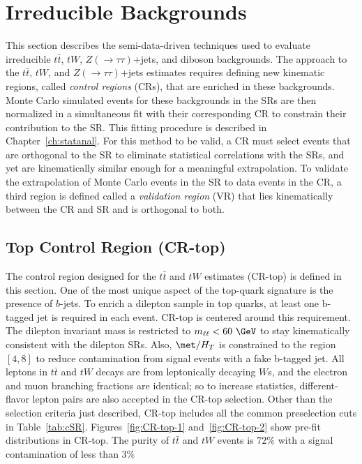 \section{Irreducible Backgrounds}
\label{sec:bkg:irreduce}
This section describes the semi-data-driven techniques used to evaluate irreducible $t\bar{t}$, $tW$, $Z(\rightarrow\tau\tau)$+jets, and diboson backgrounds.  The approach to the $t\bar{t}$, $tW$, and $Z(\rightarrow\tau\tau)$+jets estimates requires defining new kinematic regions, called \textit{control regions} (CRs), that are enriched in these backgrounds.  Monte Carlo simulated events for these backgrounds in the SRs are then normalized in a simultaneous fit with their corresponding CR to constrain their contribution to the SR.  This fitting procedure is described in Chapter~\ref{ch:statanal}.  For this method to be valid, a CR must select events that are orthogonal to the SR to eliminate statistical correlations with the SRs, and yet are kinematically similar enough for a meaningful extrapolation.  To validate the extrapolation of Monte Carlo events in the SR to data events in the CR, a third region is defined called a \textit{validation region} (VR) that lies kinematically between the CR and SR and is orthogonal to both.

\subsection{Top Control Region (CR-top)}
The control region designed for the $t\bar{t}$ and $tW$ estimates (CR-top) is defined in this section.  One of the most unique aspect of the top-quark signature is the presence of $b$-jets.  To enrich a dilepton sample in top quarks, at least one b-tagged jet is required in each event.  CR-top is centered around this requirement.  The dilepton invariant mass is restricted to $m_{\ell\ell}<60~\GeV$ to stay kinematically consistent with the dilepton SRs.  Also, $\met/H_T$ is constrained to the region $[4,8]$ to reduce contamination from signal events with a fake b-tagged jet.  All leptons in $t\bar{t}$ and $tW$ decays are from leptonically decaying $W$s, and the electron and muon branching fractions are identical; so to increase statistics, different-flavor lepton pairs are also accepted in the CR-top selection.  Other than the selection criteria just described, CR-top includes all the common preselection cuts in Table~\ref{tab:cSR}. Figures~\ref{fig:CR-top-1} and~\ref{fig:CR-top-2} show pre-fit distributions in CR-top.  The purity of $t\bar{t}$ and $tW$ events is $72\%$ with a signal contamination of less than $3\%$

